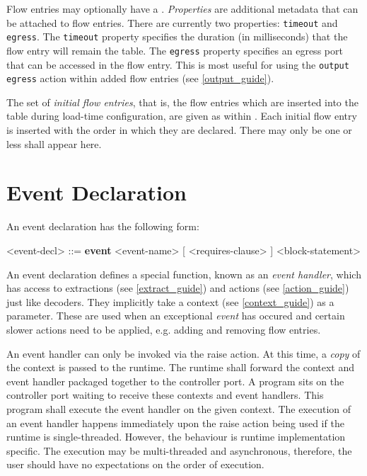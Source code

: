Flow entries may optionally have a . \textit{Properties} are additional metadata that can be attached to flow entries. There are currently two properties: \texttt{timeout} and \texttt{egress}. The \texttt{timeout} property specifies the duration (in milliseconds) that the flow entry will remain the table. The \texttt{egress} property specifies an egress port that can be accessed in the flow entry. This is most useful for using the \texttt{output egress} action within added flow entries (see \ref{output_guide}).

The set of \textit{initial flow entries}, that is, the flow entries which are inserted into the table during load-time configuration, are given as  within . Each initial flow entry is inserted with the order in which they are declared. There may only be one or less  shall appear here.

\section{Event Declaration} \label{event_guide}

An event declaration has the following form:

\begin{minip}
\begin{grammar}
<event-decl> ::=
\textbf{event} <event-name> [ <requires-clause> ]
<block-statement>
\end{grammar}
\end{minip}

An event declaration defines a special function, known as an \textit{event handler}, which has access to extractions (see \ref{extract_guide}) and actions (see \ref{action_guide}) just like decoders. They implicitly take a context (see \ref{context_guide}) as a parameter. These are used when an exceptional \textit{event} has occured and certain slower actions need to be applied, e.g. adding and removing flow entries.

An event handler can only be invoked via the raise action. At this time, a \textit{copy} of the context is passed to the runtime. The runtime shall forward the context and event handler packaged together to the controller port. A program sits on the controller port waiting to receive these contexts and event handlers. This program shall execute the event handler on the given context. The execution of an event handler happens immediately upon the raise action being used if the runtime is single-threaded. However, the behaviour is runtime implementation specific. The execution may be multi-threaded and asynchronous, therefore, the user should have no expectations on the order of execution. 

